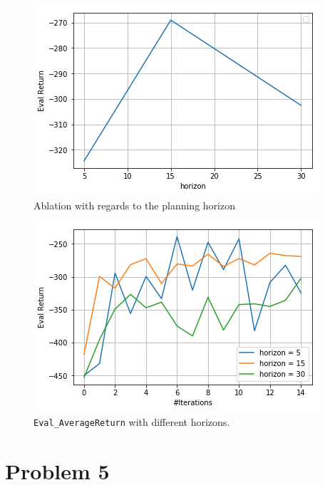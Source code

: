 \documentclass[11pt]{article}
\begin{document}
\begin{figure}[htbp]
\centering
\includegraphics[width=.9\linewidth]{./horizons.png}
\caption{Ablation with regards to the planning horizon}
\end{figure}

\begin{figure}[htbp]
\centering
\includegraphics[width=.9\linewidth]{./horizon_eval.png}
\caption{\texttt{Eval\_AverageReturn} with different horizons.}
\end{figure}


\clearpage

\section{Problem 5}
\label{sec:org284be20}
\end{document}
